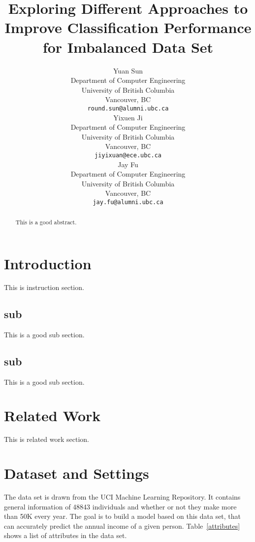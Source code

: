 \documentclass{article}
\title{Exploring Different Approaches to Improve Classification Performance for Imbalanced Data Set}
\author{%
  Yuan Sun\\
  Department of Computer Engineering\\
  University of British Columbia\\
  Vancouver, BC\\
  \texttt{round.sun@alumni.ubc.ca}\\
  \And
  Yixuen Ji\\
  Department of Computer Engineering\\
  University of British Columbia\\
  Vancouver, BC\\
  \texttt{jiyixuan@ece.ubc.ca}\\
  \AND
  Jay Fu\\
  Department of Computer Engineering\\
  University of British Columbia\\
  Vancouver, BC\\
  \texttt{jay.fu@alumni.ubc.ca}\\
}
\begin{document}

\maketitle

\begin{abstract}
  This is a good abstract.
\end{abstract}

\section{Introduction}

This is instruction section.

\subsection{sub}

This is a good sub section.

\subsection{sub}

This is a good sub section.

\section{Related Work}
\label{gen_inst}

This is related work section.

\section{Dataset and Settings}
\label{headings}

The data set is drawn from the UCI Machine Learning Repository. It contains general information of 48843 individuals and whether or not they make more than 50K every year. The goal is to build a model based on this data set, that can accurately predict the annual income of a given person. Table~\ref{attributes} shows a list of attributes in the data set.
\end{document}
